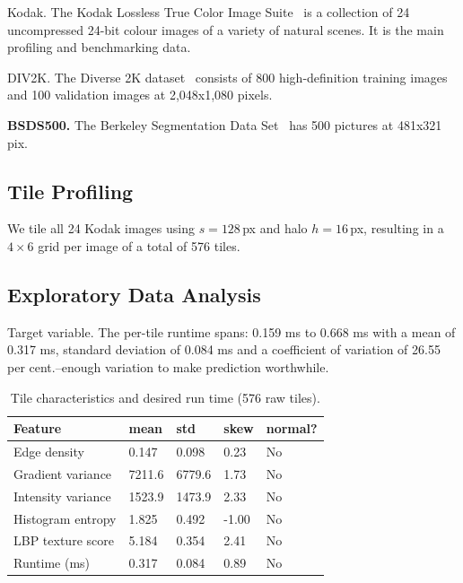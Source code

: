 \documentclass[acmsmall]{acmart}
\begin{document}
Kodak. The Kodak Lossless True Color Image Suite~\cite{Kodak} is a collection of 24 uncompressed 24-bit colour images of a variety of natural scenes. It is the main profiling and benchmarking data.

DIV2K. The Diverse 2K dataset~\cite{Timofte2017} consists of 800 high-definition training images and 100 validation images at 2,048x1,080 pixels.

\textbf{BSDS500.} The Berkeley Segmentation Data Set~\cite{Martin2001} has 500 pictures at 481x321 pix.

\subsection{Tile Profiling}

We tile all 24 Kodak images using $s=128$\,px and halo $h=16$\,px, resulting in a $4 \times 6$ grid per image of a total of \num{576} tiles.

\subsection{Exploratory Data Analysis}

Target variable. The per-tile runtime spans: 0.159 ms to 0.668 ms with a mean of 0.317 ms, standard deviation of 0.084 ms and a coefficient of variation of 26.55 per cent.--enough variation to make prediction worthwhile.

\begin{table}[htbp]
  \caption{Tile characteristics and desired run time (576 raw tiles).}
  \label{tab:eda_stats}
  \small
  \begin{tabularx}{\linewidth}{lXXXX}
    \toprule
    Feature & mean & std & skew & normal? \\
    \midrule
    Edge density          & 0.147 & 0.098 &  0.23 & No \\
    Gradient variance     & \num{7211.6} & \num{6779.6} &  1.73 & No \\
    Intensity variance    & \num{1523.9} & \num{1473.9} &  2.33 & No \\
    Histogram entropy     & 1.825 & 0.492 & -1.00 & No \\
    LBP texture score     & 5.184 & 0.354 &  2.41 & No \\
    Runtime (ms)          & 0.317 & 0.084 &  0.89 & No \\
    \bottomrule
  \end{tabularx}
\end{table}
\end{document}
